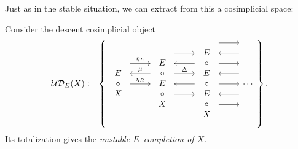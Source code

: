 Just as in the stable situation, we can extract from this a cosimplicial space:
\begin{definition}
Consider the descent cosimplicial object
\[\sheaf{UD}_E(X) := \left\{
\begin{tikzcd}
\begin{array}{c} E \\ \circ \\ X \end{array} \arrow[leftarrow, shift left=\baselineskip]{r}{\mu} \arrow[shift left=(2*\baselineskip)]{r}{\eta_L} \arrow{r}{\eta_R} &
\begin{array}{c} E \\ \circ \\ E \\ \circ \\ X \end{array} \arrow[shift left=(3*\baselineskip)]{r} \arrow[leftarrow, shift left=(2*\baselineskip)]{r} \arrow[shift left=\baselineskip]{r}{\Delta} \arrow[leftarrow]{r} \arrow[shift right=\baselineskip]{r} &
\begin{array}{c} E \\ \circ \\ E \\ \circ \\ E \\ \circ \\ X \end{array} \arrow[shift left=(4*\baselineskip)]{r} \arrow[leftarrow, shift left=(3*\baselineskip)]{r} \arrow[shift left=(2*\baselineskip)]{r} \arrow[leftarrow, shift left=\baselineskip]{r} \arrow{r} \arrow[leftarrow, shift right=\baselineskip]{r} \arrow[shift right=(2*\baselineskip)]{r} &
\cdots
\end{tikzcd}
\right\}.\]
Its totalization gives the \textit{unstable $E$--completion of $X$}.
\end{definition}

